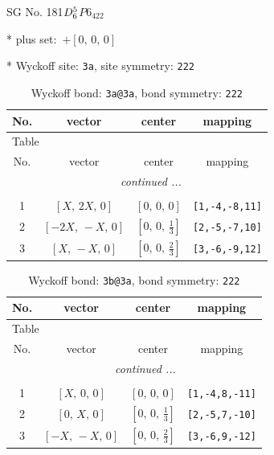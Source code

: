 \documentclass[fleqn,8pt]{jsarticle}
\begin{document}
\setcounter{MaxMatrixCols}{32}

\renewcommand{\tablename}{Table~}
\renewcommand{\figurename}{Figure~}
\begin{center}
\LARGE
SG No. 181\quad$D_{\rm 6}^{5}$\quad$P6_422$\quad[ hexagonal ]
\end{center}

* plus set:\,\,\,$+\left[ 0,\, 0,\, 0 \right]$


* Wyckoff site: {\tt 3a}, site symmetry: {\tt 222}
\renewcommand{\arraystretch}{1.2}
\begin{longtable}{cccc}
\caption{Wyckoff bond: {\tt 3a@3a}, bond symmetry: {\tt 222}}
 \\
 \hline \hline
No. & vector & center & mapping \\ \hline \endfirsthead

\multicolumn{3}{l}{\tablename\ \thetable{}} \\
 \hline \hline
No. & vector & center & mapping \\ \hline \endhead

 \hline \hline
\multicolumn{3}{r}{\footnotesize\it continued ...} \\ \endfoot

 \hline \hline
\multicolumn{3}{r}{} \\ \endlastfoot

1 & $\left[ X,\, 2 X,\, 0 \right]$ & $\left[ 0,\, 0,\, 0 \right]$ & {\tt [1,-4,-8,11]} \\ \hline
2 & $\left[ - 2 X,\, - X,\, 0 \right]$ & $\left[ 0,\, 0,\, \frac{1}{3} \right]$ & {\tt [2,-5,-7,10]} \\ \hline
3 & $\left[ X,\, - X,\, 0 \right]$ & $\left[ 0,\, 0,\, \frac{2}{3} \right]$ & {\tt [3,-6,-9,12]} \\
\end{longtable}
\renewcommand{\arraystretch}{1.2}
\begin{longtable}{cccc}
\caption{Wyckoff bond: {\tt 3b@3a}, bond symmetry: {\tt 222}}
 \\
 \hline \hline
No. & vector & center & mapping \\ \hline \endfirsthead

\multicolumn{3}{l}{\tablename\ \thetable{}} \\
 \hline \hline
No. & vector & center & mapping \\ \hline \endhead

 \hline \hline
\multicolumn{3}{r}{\footnotesize\it continued ...} \\ \endfoot

 \hline \hline
\multicolumn{3}{r}{} \\ \endlastfoot

1 & $\left[ X,\, 0,\, 0 \right]$ & $\left[ 0,\, 0,\, 0 \right]$ & {\tt [1,-4,8,-11]} \\ \hline
2 & $\left[ 0,\, X,\, 0 \right]$ & $\left[ 0,\, 0,\, \frac{1}{3} \right]$ & {\tt [2,-5,7,-10]} \\ \hline
3 & $\left[ - X,\, - X,\, 0 \right]$ & $\left[ 0,\, 0,\, \frac{2}{3} \right]$ & {\tt [3,-6,9,-12]} \\
\end{longtable}
\end{document}
